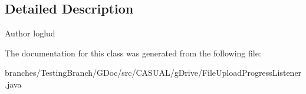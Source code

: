 \subsection{Detailed Description}
\begin{DoxyAuthor}{Author}
loglud 
\end{DoxyAuthor}


The documentation for this class was generated from the following file\-:\begin{DoxyCompactItemize}
\item 
branches/\-Testing\-Branch/\-G\-Doc/src/\-C\-A\-S\-U\-A\-L/g\-Drive/File\-Upload\-Progress\-Listener.\-java\end{DoxyCompactItemize}

